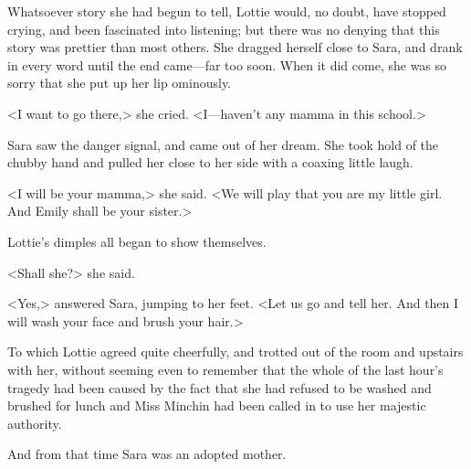 Whatsoever story she had begun to tell, Lottie would, no doubt, have stopped crying, and been fascinated into listening; but there was no denying that this story was prettier than most others. She dragged herself close to Sara, and drank in every word until the end came—far too soon. When it did come, she was so sorry that she put up her lip ominously.

<I want to go there,> she cried. <I—haven't any mamma in this school.>

Sara saw the danger signal, and came out of her dream. She took hold of the chubby hand and pulled her close to her side with a coaxing little laugh.

<I will be your mamma,> she said. <We will play that you are my little girl. And Emily shall be your sister.>

Lottie's dimples all began to show themselves.

<Shall she?> she said.

<Yes,> answered Sara, jumping to her feet. <Let us go and tell her. And then I will wash your face and brush your hair.>

To which Lottie agreed quite cheerfully, and trotted out of the room and upstairs with her, without seeming even to remember that the whole of the last hour's tragedy had been caused by the fact that she had refused to be washed and brushed for lunch and Miss Minchin had been called in to use her majestic authority.

And from that time Sara was an adopted mother.

\begin{a4}
	\enlargethispage{\baselineskip}
\end{a4}